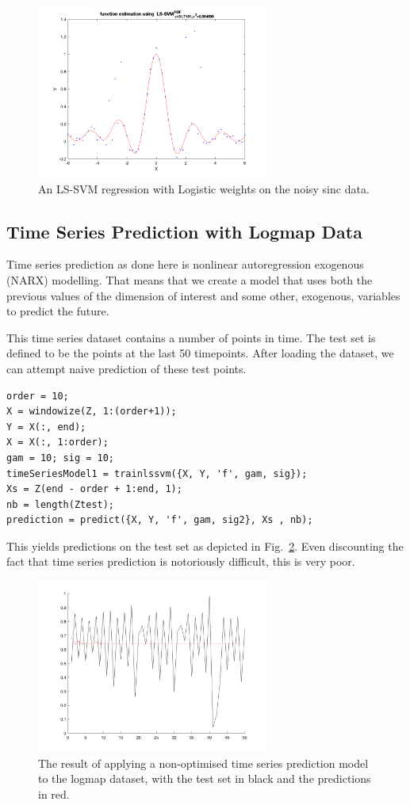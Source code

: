 \documentclass[10pt,a4paper]{article}
\begin{document}
\begin{figure}[h!]
  \includegraphics[width=3in]{robustLogistic.png}
  \caption{An LS-SVM regression with Logistic weights on the noisy sinc data.}
  \label{fig:logisticRobust}
\end{figure}



\subsection{Time Series Prediction with Logmap Data}
Time series prediction as done here is nonlinear autoregression exogenous (NARX) modelling. That means that we create a model that uses both the previous values of the dimension of interest and some other, exogenous, variables to predict the future.

This time series dataset contains a number of points in time. The test set is defined to be the points at the last 50 timepoints. After loading the dataset, we can attempt naive prediction of these test points.

\begin{lstlisting}[style=Matlab-editor]
order = 10;
X = windowize(Z, 1:(order+1));
Y = X(:, end);
X = X(:, 1:order);
gam = 10; sig = 10;
timeSeriesModel1 = trainlssvm({X, Y, 'f', gam, sig});
Xs = Z(end - order + 1:end, 1);
nb = length(Ztest);
prediction = predict({X, Y, 'f', gam, sig2}, Xs , nb);
\end{lstlisting}

This yields predictions on the test set as depicted in Fig.~\ref{fig:logmapNaive}. Even discounting the fact that time series prediction is notoriously difficult, this is very poor.

\begin{figure}[h!]
  \includegraphics[width=3in]{logmapNaive.png}
  \caption{The result of applying a non-optimised time series prediction model to the logmap dataset, with the test set in black and the predictions in red.}
  \label{fig:logmapNaive}
\end{figure}
 




\end{document}
